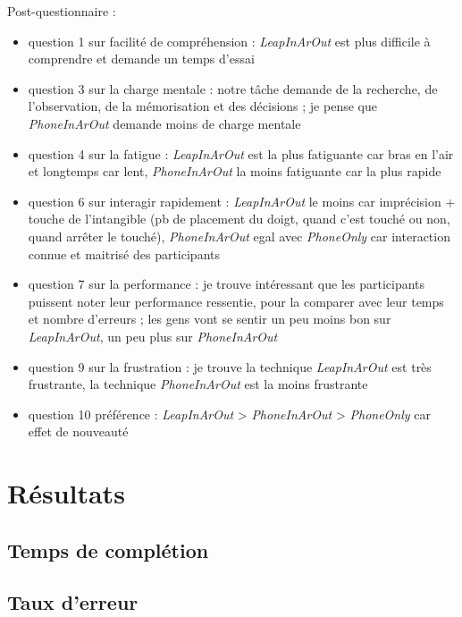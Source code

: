 Post-questionnaire :
\begin{itemize}
  \item question 1 sur facilité de compréhension : \textit{LeapInArOut} est plus difficile à comprendre et demande un temps d'essai
  \item question 3 sur la charge mentale : notre tâche demande de la recherche, de l'observation, de la mémorisation et des décisions ; je pense que \textit{PhoneInArOut} demande moins de charge mentale
  \item question 4 sur la fatigue : \textit{LeapInArOut} est la plus fatiguante car bras en l'air et longtemps car lent, \textit{PhoneInArOut} la moins fatiguante car la plus rapide
  \item question 6 sur interagir rapidement : \textit{LeapInArOut} le moins car imprécision + touche de l'intangible (pb de placement du doigt, quand c'est touché ou non, quand arrêter le touché), \textit{PhoneInArOut} egal avec \textit{PhoneOnly} car interaction connue et maitrisé des participants
  \item question 7 sur la performance : je trouve intéressant que les participants puissent noter leur performance ressentie, pour la comparer avec leur temps et nombre d'erreurs ; les gens vont se sentir un peu moins bon sur \textit{LeapInArOut}, un peu plus sur \textit{PhoneInArOut}
  \item question 9 sur la frustration : je trouve la technique \textit{LeapInArOut} est très frustrante, la technique \textit{PhoneInArOut} est la moins frustrante
  \item question 10 préférence : \textit{LeapInArOut} > \textit{PhoneInArOut} > \textit{PhoneOnly} car effet de nouveauté
\end{itemize}


\section{Résultats}
\subsection{Temps de complétion}




\subsection{Taux d'erreur}

